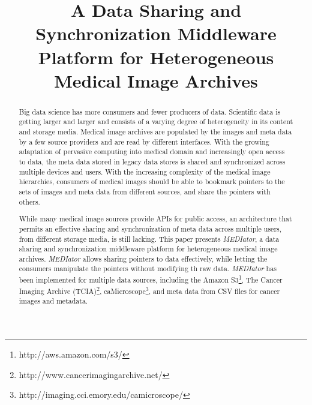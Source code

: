 \documentclass[conference]{IEEEtran}
\begin{document}
\title{A Data Sharing and Synchronization Middleware Platform for Heterogeneous Medical Image Archives}

\author{
\and
{}
}
\maketitle

\begin{abstract}
Big data science has more consumers and fewer producers of data. Scientific data is getting larger and larger and consists of a varying degree of heterogeneity in its content and storage media. Medical image archives are populated by the images and meta data by a few source providers and are read by different interfaces. With the growing adaptation of pervasive computing into medical domain and increasingly open access to data, the meta data stored in legacy data stores is shared and synchronized across multiple devices and users. With the increasing complexity of the medical image hierarchies, consumers of medical images should be able to bookmark pointers to the sets of images and meta data from different sources, and share the pointers with others. 

While many medical image sources provide APIs for public access, an architecture that permits an effective sharing and synchronization of meta data across multiple users, from different storage media, is still lacking. This paper presents \textit{MEDIator}, a data sharing and synchronization middleware platform for heterogeneous medical image archives. \textit{MEDIator} allows sharing pointers to data effectively, while letting the consumers manipulate the pointers without modifying th raw data. \textit{MEDIator} has been implemented for multiple data sources, including the Amazon S3\footnote{http://aws.amazon.com/s3/}, The Cancer Imaging Archive (TCIA)\footnote{http://www.cancerimagingarchive.net/}, caMicroscope\footnote{http://imaging.cci.emory.edu/camicroscope/}, and meta data from CSV files for cancer images and metadata.
\end{abstract}
\end{document}
